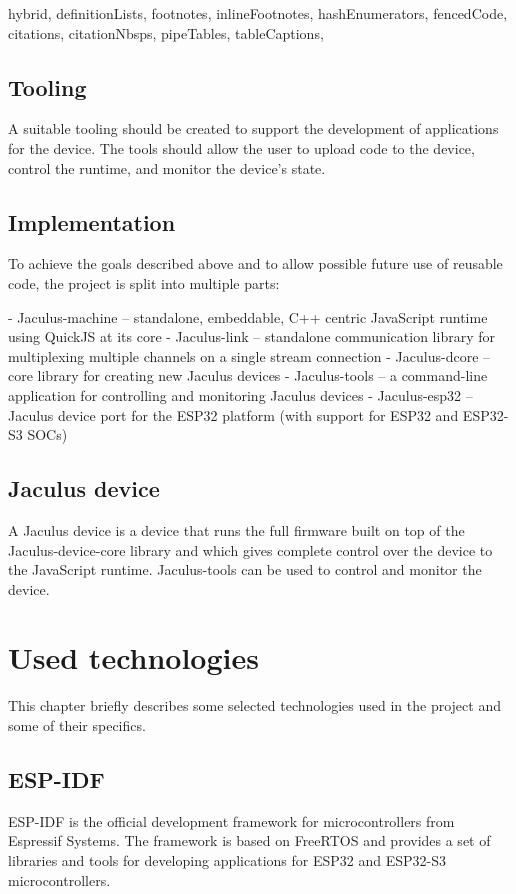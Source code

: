 \documentclass[
  digital,
  oneside,
  nosansbold,
  nocolorbold,
  lof,
  lot
]{fithesis4}
\begin{document}
\begin{markdown*}{%
  hybrid,
  definitionLists,
  footnotes,
  inlineFootnotes,
  hashEnumerators,
  fencedCode,
  citations,
  citationNbsps,
  pipeTables,
  tableCaptions,
}
\section{Tooling}

A suitable tooling should be created to support the development of applications for the device. The tools should allow the user to upload code to the device, control the runtime, and monitor the device's state.

\section{Implementation}

To achieve the goals described above and to allow possible future use of reusable code, the project is split into multiple parts:

  - Jaculus-machine -- standalone, embeddable, C++ centric JavaScript runtime using QuickJS at its core
  - Jaculus-link -- standalone communication library for multiplexing multiple channels on a single stream connection
  - Jaculus-dcore -- core library for creating new Jaculus devices
  - Jaculus-tools -- a command-line application for controlling and monitoring Jaculus devices
  - Jaculus-esp32 -- Jaculus device port for the ESP32 platform (with support for ESP32 and ESP32-S3 SOCs)

\section{Jaculus device}

A Jaculus device is a device that runs the full firmware built on top of the Jaculus-device-core library and which gives complete control over the device to the JavaScript runtime. Jaculus-tools can be used to control and monitor the device.


\chapter{Used technologies}

This chapter briefly describes some selected technologies used in the project and some of their specifics.

\section{ESP-IDF}

ESP-IDF is the official development framework for microcontrollers from Espressif Systems. The framework is based on FreeRTOS and provides a set of libraries and tools for developing applications for ESP32 and ESP32-S3 microcontrollers.


\end{markdown*}
\end{document}
